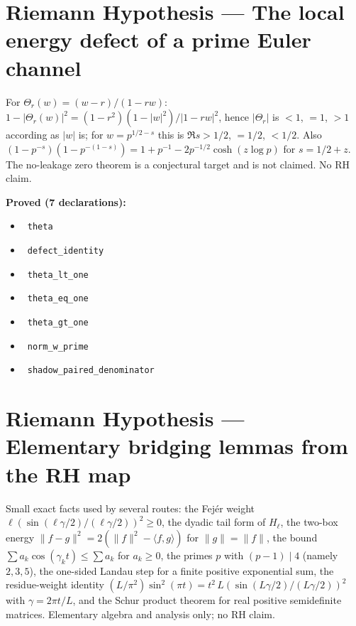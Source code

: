 \documentclass{report}
\theoremstyle{definition}
\begin{document}
\section{Riemann Hypothesis --- The local energy defect of a prime Euler channel}
For $\Theta_r(w)=(w-r)/(1-rw)$: $1-|\Theta_r(w)|^2=(1-r^2)(1-|w|^2)/|1-rw|^2$, hence $|\Theta_r|$ is $<1$, $=1$, $>1$ according as $|w|$ is; for $w=p^{1/2-s}$ this is $\Re s>1/2$, $=1/2$, $<1/2$. Also $(1-p^{-s})(1-p^{-(1-s)})=1+p^{-1}-2p^{-1/2}\cosh(z\log p)$ for $s=1/2+z$. The no-leakage zero theorem is a conjectural target and is not claimed. No RH claim.

\noindent\textbf{Proved (7 declarations):}
\begin{itemize}
  \item {}\leanok\ \texttt{theta}
  \item {}\leanok\ \texttt{defect\_identity}
  \item {}\leanok\ \texttt{theta\_lt\_one}
  \item {}\leanok\ \texttt{theta\_eq\_one}
  \item {}\leanok\ \texttt{theta\_gt\_one}
  \item {}\leanok\ \texttt{norm\_w\_prime}
  \item {}\leanok\ \texttt{shadow\_paired\_denominator}
\end{itemize}

\section{Riemann Hypothesis --- Elementary bridging lemmas from the RH map}
Small exact facts used by several routes: the Fej\'er weight $\ell(\sin(\ell\gamma/2)/(\ell\gamma/2))^2\ge0$, the dyadic tail form of $H_\ell$, the two-box energy $\|f-g\|^2=2(\|f\|^2-\langle f,g\rangle)$ for $\|g\|=\|f\|$, the bound $\sum a_k\cos(\gamma_kt)\le\sum a_k$ for $a_k\ge0$, the primes $p$ with $(p-1)\mid4$ (namely $2,3,5$), the one-sided Landau step for a finite positive exponential sum, the residue-weight identity $(L/\pi^2)\sin^2(\pi t)=t^2\,L(\sin(L\gamma/2)/(L\gamma/2))^2$ with $\gamma=2\pi t/L$, and the Schur product theorem for real positive semidefinite matrices. Elementary algebra and analysis only; no RH claim.
\end{document}
